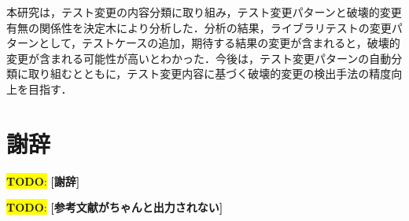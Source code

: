 \documentclass[uplatex,dvipdfmx,a4paper,twocolumn,base=11pt,jbase=11pt,ja=standard]{bxjsarticle}  %
\newcommand{\todo}[1]{\colorbox{yellow}{{\bf TODO}:}{\color{red} {\textbf{[#1]}}}}
\begin{document}
本研究は，テスト変更の内容分類に取り組み，テスト変更パターンと破壊的変更有無の関係性を決定木により分析した．分析の結果，ライブラリテストの変更パターンとして，テストケースの追加，期待する結果の変更が含まれると，破壊的変更が含まれる可能性が高いとわかった．今後は，テスト変更パターンの自動分類に取り組むとともに，テスト変更内容に基づく破壊的変更の検出手法の精度向上を目指す．

\section*{謝辞}

\todo{謝辞}

 

\todo{参考文献がちゃんと出力されない}
\end{document}
